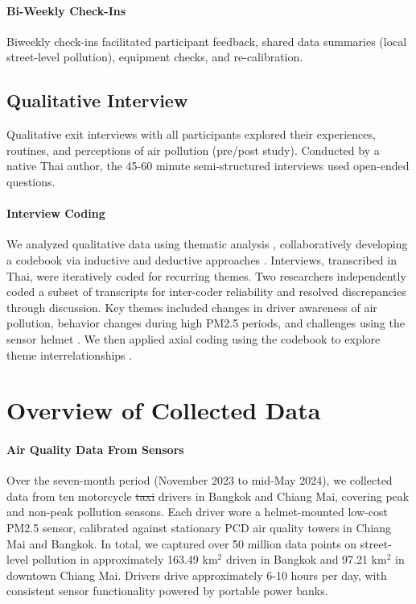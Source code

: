 \documentclass[sigconf,screen,natbib=true]{acmart}
\providecommand{\DIFadd}[1]{{\protect\color{blue}\uwave{#1}}} %
\providecommand{\DIFdel}[1]{{\protect\color{red}\sout{#1}}} %
\providecommand{\DIFaddbegin}{} %
\providecommand{\DIFaddend}{} %
\providecommand{\DIFdelbegin}{} %
\providecommand{\DIFdelend}{} %
\begin{document}
\paragraph{Bi-Weekly Check-Ins}
Biweekly check-ins facilitated participant feedback, shared data summaries (local street-level pollution), equipment checks, and re-calibration.






\subsection{Qualitative Interview}

Qualitative exit interviews with all participants explored their experiences, routines, and perceptions of air pollution (pre/post study).
Conducted by a native Thai author, the 45-60 minute semi-structured interviews used open-ended questions. 


\paragraph{Interview Coding}




We analyzed qualitative data using thematic analysis \cite{braun2006using}, collaboratively developing a codebook via inductive and deductive approaches \cite{saldana2021coding,kathleen2008team}.
Interviews, transcribed in Thai, were iteratively coded for recurring themes.
Two researchers independently coded a subset of transcripts for inter-coder reliability and resolved discrepancies through discussion.
Key themes included changes in driver awareness of air pollution, behavior changes during high PM2.5 periods, and challenges using the sensor helmet \DIFaddbegin {}\DIFaddend .
We then applied axial coding using the codebook to explore theme interrelationships \cite{williams2019art}.


 

\section{Overview of Collected Data}
\label{sec:result-overview-data}

\paragraph{Air Quality Data From Sensors}
Over the seven-month period (November 2023 to mid-May 2024), we collected data from ten motorcycle \DIFdelbegin \DIFdel{taxi }\DIFdelend \DIFaddbegin \DIFadd{rideshare }\DIFaddend drivers in Bangkok and Chiang Mai, covering peak and non-peak pollution seasons.
Each driver wore a helmet-mounted low-cost PM2.5 sensor, calibrated against stationary PCD air quality towers in Chiang Mai and Bangkok.
In total, we captured over 50 million data points on street-level pollution in approximately 163.49 km$^2$ driven in Bangkok and 97.21 km$^2$ in downtown Chiang Mai.
Drivers drive approximately 6-10 hours per day, with consistent sensor functionality powered by portable power banks.
\end{document}
